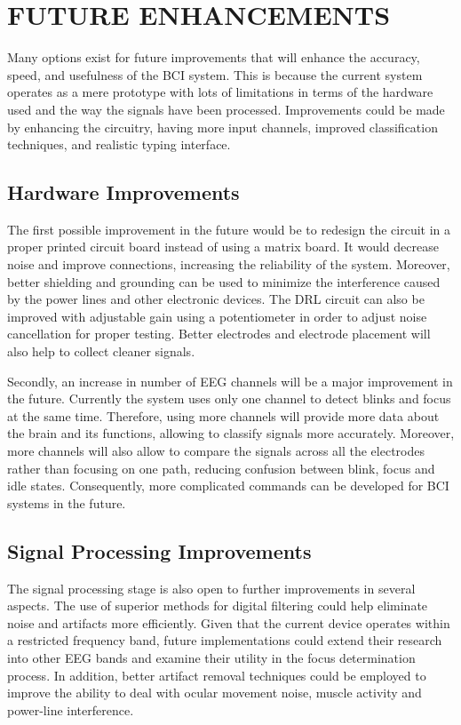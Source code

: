 \chapter{FUTURE ENHANCEMENTS}

Many options exist for future improvements that will enhance the accuracy, speed, and usefulness of the BCI system. This is because the current system operates as a mere prototype with lots of limitations in terms of the hardware used and the way the signals have been processed. Improvements could be made by enhancing the circuitry, having more input channels, improved classification techniques, and realistic typing interface.

\section{Hardware Improvements}

The first possible improvement in the future would be to redesign the circuit in a proper printed circuit board instead of using a matrix board. It would decrease noise and improve connections, increasing the reliability of the system. Moreover, better shielding and grounding can be used to minimize the interference caused by the power lines and other electronic devices. The DRL circuit can also be improved with adjustable gain using a potentiometer in order to adjust noise cancellation for proper testing. Better electrodes and electrode placement will also help to collect cleaner signals.

Secondly, an increase in number of EEG channels will be a major improvement in the future. Currently the system uses only one channel to detect blinks and focus at the same time. Therefore, using more channels will provide more data about the brain and its functions, allowing to classify signals more accurately. Moreover, more channels will also allow to compare the signals across all the electrodes rather than focusing on one path, reducing confusion between blink, focus and idle states. Consequently, more complicated commands can be developed for BCI systems in the future.

\section{Signal Processing Improvements}

The signal processing stage is also open to further improvements in several aspects. The use of superior methods for digital filtering could help eliminate noise and artifacts more efficiently. Given that the current device operates within a restricted frequency band, future implementations could extend their research into other EEG bands and examine their utility in the focus determination process. In addition, better artifact removal techniques could be employed to improve the ability to deal with ocular movement noise, muscle activity and power-line interference.

